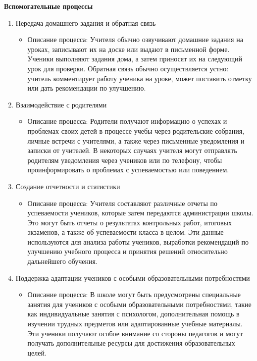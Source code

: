 \documentclass[a4paper, final]{article}
\begin{document}
\textbf{Вспомогательные процессы}
\begin{enumerate}
  \item Передача домашнего задания и обратная связь
  \begin{itemize}
    \item Описание процесса: Учителя обычно озвучивают домашние задания на уроках, записывают их на доске или выдают в письменной форме. Ученики выполняют задания дома, а затем приносят их на следующий урок для проверки. Обратная связь обычно осуществляется устно: учитель комментирует работу ученика на уроке, может поставить отметку или дать рекомендации по улучшению.
  \end{itemize}

  \item Взаимодействие с родителями
  \begin{itemize}
    \item Описание процесса: Родители получают информацию о успехах и проблемах своих детей в процессе учебы через родительские собрания, личные встречи с учителями, а также через письменные уведомления и записки от учителей. В некоторых случаях учителя могут отправлять родителям уведомления через учеников или по телефону, чтобы проинформировать о проблемах с успеваемостью или поведением.
  \end{itemize}

  \item Создание отчетности и статистики
  \begin{itemize}
    \item Описание процесса: Учителя составляют различные отчеты по успеваемости учеников, которые затем передаются администрации школы. Это могут быть отчеты о результатах контрольных работ, итоговых экзаменов, а также об успеваемости класса в целом. Эти данные используются для анализа работы учеников, выработки рекомендаций по улучшению учебного процесса и принятия решений относительно дальнейшего обучения.
  \end{itemize}

  \item Поддержка адаптации учеников с особыми образовательными потребностями
  \begin{itemize}
    \item Описание процесса: В школе могут быть предусмотрены специальные занятия для учеников с особыми образовательными потребностями, такие как индивидуальные занятия с психологом, дополнительная помощь в изучении трудных предметов или адаптированные учебные материалы. Эти ученики получают особое внимание со стороны педагогов и могут получать дополнительные ресурсы для достижения образовательных целей.
  \end{itemize}
  

\end{enumerate}
\end{document}
